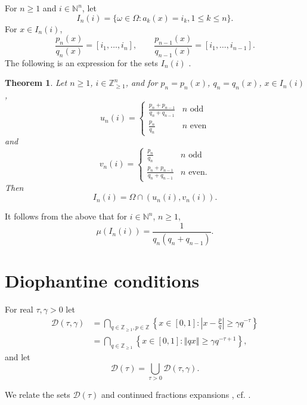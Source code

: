 \documentclass{amsart}
\newcommand{\norm}[1]{\left\Vert #1 \right\Vert}
\newtheorem{theorem}{Theorem}
\begin{document}
For $n \geq 1$ and $i \in \mathbb{N}^n$, 
let 
\[
I_n(i) = \{\omega \in \Omega: a_k(x) = i_k, 1 \leq k \leq n\}.
\]
For $x \in I_n(i)$, 
\[
\frac{p_n(x)}{q_n(x)} = [i_1,\ldots,i_n],
\qquad \frac{p_{n-1}(x)}{q_{n-1}(x)} = [i_1,\ldots,i_{n-1}].
\]
The following is an expression for the sets $I_n(i)$ \cite[p.~18, Theorem 1.2.2]{iosifescu}.

\begin{theorem}
Let $n \geq 1$, $i \in \mathbb{Z}_{\geq 1}^n$,
and for $p_n=p_n(x)$, $q_n=q_n(x)$, $x \in I_n(i)$,
\[
u_n(i) = \begin{cases}
\frac{p_n+p_{n-1}}{q_n+q_{n-1}}&\textrm{$n$ odd}\\
\frac{p_n}{q_n}&\textrm{$n$ even}
\end{cases}
\]
and
\[
v_n(i) = \begin{cases}
\frac{p_n}{q_n}&\textrm{$n$ odd}\\
\frac{p_n+p_{n-1}}{q_n+q_{n-1}}&\textrm{$n$ even}.
\end{cases}
\]
Then
\[
I_n(i) = \Omega \cap (u_n(i),v_n(i)).
\]
\end{theorem}

It follows from the above that for $i \in \mathbb{N}^n$, $n \geq 1$,
\[
\mu(I_n(i)) = \frac{1}{q_n(q_n+q_{n-1})}.
\]





\section{Diophantine conditions}
For real $\tau,\gamma>0$ let
\begin{align*}
\mathcal{D}(\tau,\gamma) &=\bigcap_{q \in \mathbb{Z}_{\geq 1}, p \in \mathbb{Z}} \left\{x \in [0,1]: \left|x-\frac{p}{q}\right| \geq \gamma q^{-\tau} \right\}\\
&=\bigcap_{q \in \mathbb{Z}_{\geq 1}} \left\{x \in [0,1]: \norm{qx} \geq \gamma q^{-\tau+1} \right\},
\end{align*}
and let
\[
\mathcal{D}(\tau) = \bigcup_{\tau>0} \mathcal{D}(\tau,\gamma).
\]

We relate the sets $\mathcal{D}(\tau)$ and continued fractions expansions  \cite[p.~241, Lemma C.6]{milnor}, cf.  \cite[p.~130, Proposition 2.4]{yoccoz}.
\end{document}
